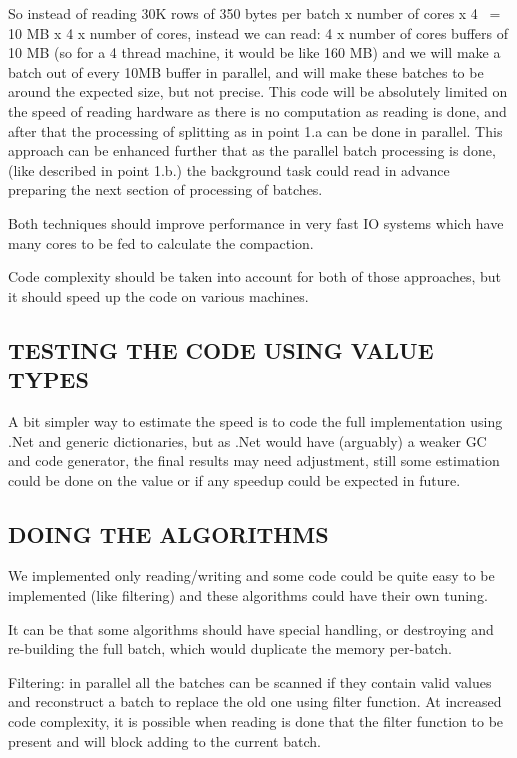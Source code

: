 \documentclass[a4paper,twoside]{article}
\begin{document}
So instead of reading 30K rows of 350 bytes per batch x number of cores x 4 ~= 10 MB x 4 x number of cores, instead we can read:
4 x number of cores buffers of 10 MB (so for a 4 thread machine, it would be like 160 MB) and we will make a batch out of every 10MB buffer in parallel, and will make these batches to be 
around the expected size, but not precise.
This code will be absolutely limited on the speed of reading hardware as there is no computation as reading is done, and after that the processing of splitting 
as in point 1.a can be done in parallel. This approach can be enhanced further that as the parallel batch processing is done, (like described in point 1.b.) 
the background task could read in advance preparing the next section of processing of batches.

Both techniques should improve performance in very fast IO systems which have many cores to be fed to calculate the compaction.

Code complexity should be taken into account for both of those approaches, but it should speed up the code on various machines.

\subsection{\uppercase{Testing the code using Value Types}}


A bit simpler way to estimate the speed is to code the full implementation using .Net and generic dictionaries, but as .Net would have (arguably) a weaker GC and code generator, the final results may need adjustment, still some estimation could be done on the value or if any speedup could be expected in future.

\subsection{\uppercase{Doing the algorithms}}

We implemented only reading/writing and some code could be quite easy to be implemented (like filtering) and these algorithms could have their own tuning. 

It can be that some algorithms should have special handling, or destroying and re-building the full batch, which would duplicate the memory per-batch.

Filtering: in parallel all the batches can be scanned if they contain valid values and reconstruct a batch to replace the old one using filter function. At increased code complexity, it is possible when reading is done that the filter function to be present and will block adding to the current batch.
\end{document}
